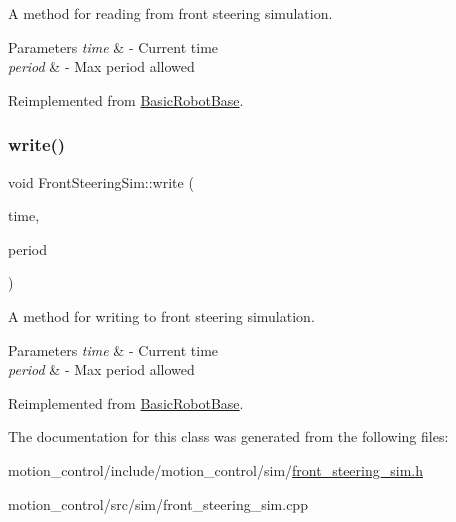 A method for reading from front steering simulation. 


\begin{DoxyParams}{Parameters}
{\em time} & -\/ Current time \\
\hline
{\em period} & -\/ Max period allowed \\
\hline
\end{DoxyParams}


Reimplemented from \hyperlink{classBasicRobotBase_a64bb2c7bed72e98fb62a37d6beb4fe5a}{Basic\+Robot\+Base}.

\mbox{\label{classFrontSteeringSim_afbf1c3df92319f90d5019729e9067585}} 
\subsubsection{\texorpdfstring{write()}{write()}}
{\footnotesize\ttfamily void Front\+Steering\+Sim\+::write (\begin{DoxyParamCaption}\item[{const ros\+::\+Time \&}]{time,  }\item[{const ros\+::\+Duration \&}]{period }\end{DoxyParamCaption})\hspace{0.3cm}{\ttfamily [virtual]}}



A method for writing to front steering simulation. 


\begin{DoxyParams}{Parameters}
{\em time} & -\/ Current time \\
\hline
{\em period} & -\/ Max period allowed \\
\hline
\end{DoxyParams}


Reimplemented from \hyperlink{classBasicRobotBase_afbc6ef4347fc05e053391692a9e1bc24}{Basic\+Robot\+Base}.



The documentation for this class was generated from the following files\+:\begin{DoxyCompactItemize}
\item 
motion\+\_\+control/include/motion\+\_\+control/sim/\hyperlink{front__steering__sim_8h}{front\+\_\+steering\+\_\+sim.\+h}\item 
motion\+\_\+control/src/sim/front\+\_\+steering\+\_\+sim.\+cpp\end{DoxyCompactItemize}
